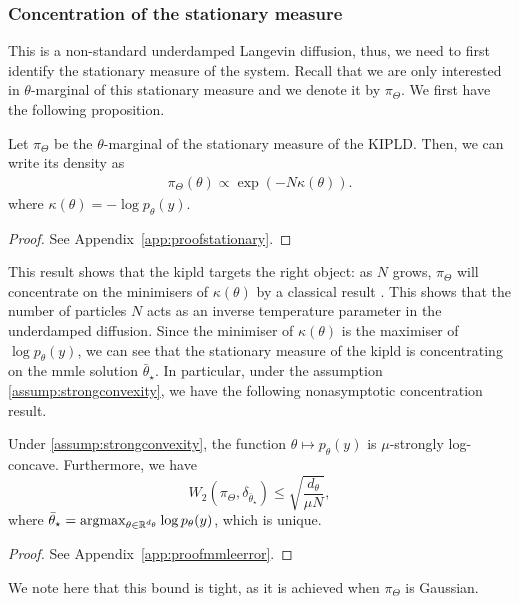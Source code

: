\subsubsection{Concentration of the stationary measure}\label{sec:conv_stationary}
This is a non-standard underdamped Langevin diffusion, thus, we need to first identify the stationary measure of the system. Recall that we are only interested in $\theta$-marginal of this stationary measure and we denote it by $\pi_\Theta$. We first have the following proposition.
\begin{proposition} \label{prop:stationary}
Let $\pi_\Theta$ be the $\theta$-marginal of the stationary measure of the KIPLD. Then, we can write its density as
\begin{align}
\pi_\Theta(\theta) \propto \exp( - N \kappa(\theta)).
\end{align}
where $\kappa(\theta) = - \log p_\theta(y)$.
\end{proposition}
\begin{proof} See Appendix~\ref{app:proofstationary}.
\end{proof}
This result shows that the \gls*{kipld} targets the right object: as $N$ grows, $\pi_\Theta$ will concentrate on the minimisers of $\kappa(\theta)$ by a classical result \citep{hwang1980laplace}. This shows that the number of particles $N$ acts as an inverse temperature parameter in the underdamped diffusion. Since the minimiser of $\kappa(\theta)$ is the maximiser of $\log p_\theta(y)$, we can see that the stationary measure of the \gls*{kipld} is concentrating on the \gls*{mmle} solution $\bar{\theta}_\star$. In particular, under the assumption \ref{assump:strongconvexity}, we have the following nonasymptotic concentration result.
\begin{proposition}\label{prop:mmleerror}
Under \ref{assump:strongconvexity}, the function $\theta \mapsto p_\theta(y)$ is $\mu$-strongly log-concave. Furthermore, we have
\begin{equation*}
W_2(\pi_\Theta, \delta_{\bar{\theta}_\star})\leq \sqrt{\frac{d_\theta}{\mu N}},
\end{equation*}
where $\bar{\theta}_\star = \argmax_{\theta\in\mathbb{R}^{d_\theta}} \log p_\theta(y)$,
which is unique.
\end{proposition}

\begin{proof}
See Appendix~\ref{app:proofmmleerror}.
\end{proof}

We note here that this bound is tight, as it is achieved when $\pi_\Theta$ is Gaussian.

